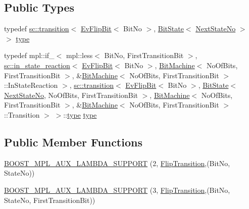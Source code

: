 \subsection*{Public Types}
\begin{DoxyCompactItemize}
\item 
typedef \mbox{\hyperlink{classboost_1_1statechart_1_1transition}{sc\+::transition}}$<$ \mbox{\hyperlink{struct_ev_flip_bit}{Ev\+Flip\+Bit}}$<$ Bit\+No $>$, \mbox{\hyperlink{struct_bit_state}{Bit\+State}}$<$ \mbox{\hyperlink{struct_flip_transition_a16b33cbdacbffc0e20e2ae9c76e8f645}{Next\+State\+No}} $>$ $>$ \mbox{\hyperlink{struct_flip_transition_acb1fc32084f19c5bd106af2da39df89e}{type}}
\item 
typedef mpl\+::if\+\_\+$<$ mpl\+::less$<$ Bit\+No, First\+Transition\+Bit $>$, \mbox{\hyperlink{classboost_1_1statechart_1_1in__state__reaction}{sc\+::in\+\_\+state\+\_\+reaction}}$<$ \mbox{\hyperlink{struct_ev_flip_bit}{Ev\+Flip\+Bit}}$<$ Bit\+No $>$, \mbox{\hyperlink{struct_bit_machine}{Bit\+Machine}}$<$ No\+Of\+Bits, First\+Transition\+Bit $>$, \&\mbox{\hyperlink{struct_bit_machine}{Bit\+Machine}}$<$ No\+Of\+Bits, First\+Transition\+Bit $>$\+::In\+State\+Reaction $>$, \mbox{\hyperlink{classboost_1_1statechart_1_1transition}{sc\+::transition}}$<$ \mbox{\hyperlink{struct_ev_flip_bit}{Ev\+Flip\+Bit}}$<$ Bit\+No $>$, \mbox{\hyperlink{struct_bit_state}{Bit\+State}}$<$ \mbox{\hyperlink{struct_flip_transition_a16b33cbdacbffc0e20e2ae9c76e8f645}{Next\+State\+No}}, No\+Of\+Bits, First\+Transition\+Bit $>$, \mbox{\hyperlink{struct_bit_machine}{Bit\+Machine}}$<$ No\+Of\+Bits, First\+Transition\+Bit $>$, \&\mbox{\hyperlink{struct_bit_machine}{Bit\+Machine}}$<$ No\+Of\+Bits, First\+Transition\+Bit $>$\+::Transition $>$ $>$\+::\mbox{\hyperlink{struct_flip_transition_acb1fc32084f19c5bd106af2da39df89e}{type}} \mbox{\hyperlink{struct_flip_transition_a6cf04e1d55488950cbaeeae1f16f8f21}{type}}
\end{DoxyCompactItemize}
\subsection*{Public Member Functions}
\begin{DoxyCompactItemize}
\item 
\mbox{\hyperlink{struct_flip_transition_a242a3dee150500fdcfdd980ca82a45e4}{B\+O\+O\+S\+T\+\_\+\+M\+P\+L\+\_\+\+A\+U\+X\+\_\+\+L\+A\+M\+B\+D\+A\+\_\+\+S\+U\+P\+P\+O\+RT}} (2, \mbox{\hyperlink{struct_flip_transition}{Flip\+Transition}},(Bit\+No, State\+No))
\item 
\mbox{\hyperlink{struct_flip_transition_ad9b80d15c35a0bff9e0f9ff8b0219d16}{B\+O\+O\+S\+T\+\_\+\+M\+P\+L\+\_\+\+A\+U\+X\+\_\+\+L\+A\+M\+B\+D\+A\+\_\+\+S\+U\+P\+P\+O\+RT}} (3, \mbox{\hyperlink{struct_flip_transition}{Flip\+Transition}},(Bit\+No, State\+No, First\+Transition\+Bit))
\end{DoxyCompactItemize}
